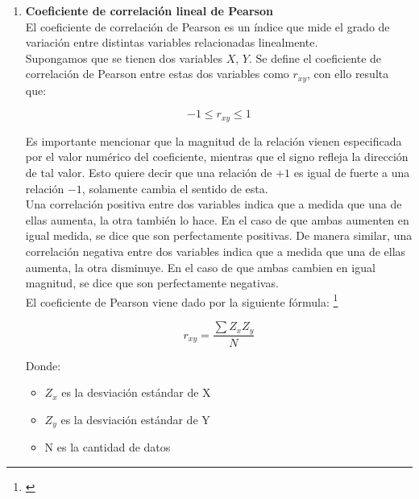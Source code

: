 \begin{enumerate}
    \item \textbf{Coeficiente de correlación lineal de Pearson} \\
    
    El coeficiente de correlación de Pearson es un índice que mide el grado de variación entre distintas variables relacionadas linealmente. \\
    
    Supongamos que se tienen dos variables $X$, $Y$.
    Se define el coeficiente de correlación de Pearson entre estas dos variables como $r_{xy}$, con ello resulta que:
    
    \begin{equation*}
        -1 \leq r_{xy} \leq 1
    \end{equation*}
    
    Es importante mencionar que la magnitud de la relación vienen especificada por el valor numérico del coeficiente, mientras que el signo refleja la dirección de tal valor. Esto quiere decir que una relación de $+1$ es igual de fuerte a una relación $-1$, solamente cambia el sentido de esta. \\
    
    Una correlación positiva entre dos variables indica que a medida que una de ellas aumenta, la otra también lo hace. En el caso de que ambas aumenten en igual medida, se dice que son perfectamente positivas. De manera similar, una correlación negativa entre dos variables indica que a medida que una de ellas aumenta, la otra disminuye. En el caso de que ambas cambien en igual magnitud, se dice que son perfectamente negativas.\\
    
    El coeficiente de Pearson viene dado por la siguiente fórmula: \footnote{\cite{coef_pearsen}}
    
    \begin{equation}
        r_{xy} = \frac{\sum Z_x Z_y}{N} 
    \end{equation}
   
    Donde: 
   
    \begin{itemize}
        \item $Z_x$ es la desviación estándar de X
        \item $Z_y$ es la desviación estándar de Y
        \item N es la cantidad de datos 
    \end{itemize}


\end{enumerate}
